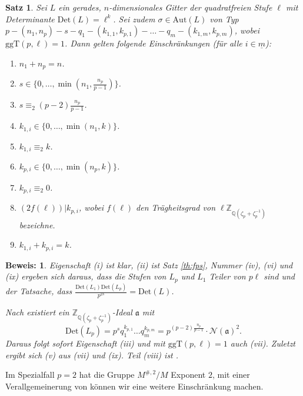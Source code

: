 \documentclass[12pt,a4paper,halfparskip,headsepline,bibtotocnumbered]{scrreprt}
\theoremstyle{nummermitklammern}
\newtheorem{satz}[defsatzusw]{Satz}
\theoremstyle{nonumberbreak}
\newtheorem{beweis}{Beweis:}
\newcommand{\Z}{\mathbb{Z}}
\newcommand{\Q}{\mathbb{Q}}
\newcommand{\No}{\mathcal{N}}
\newcommand{\Det}{\text{Det}}
\renewcommand{\a}{\mathfrak{a}}
\begin{document}
\begin{framed}
	\begin{satz} \label{th:restrict}
		Sei $L$ ein gerades, $n$-dimensionales Gitter der quadratfreien Stufe $\ell$ mit Determinante $\Det(L) = \ell^k$. Sei zudem $\sigma \in \text{Aut}(L)$ von Typ $p - (n_1, n_p) - s - q_1 - (k_{1,1}, k_{p,1}) - \dots - q_m - (k_{1,m}, k_{p,m})$, wobei $\text{ggT}(p, \ell) = 1$. Dann gelten folgende Einschränkungen (für alle $i \in \underline{m}$):
		\begin{enumerate}[label=(\roman*)]
			\item $n_1 + n_p = n$.
			\item $s \in \lbrace 0, \dots, \min(n_1, \frac{n_p}{p-1}) \rbrace$.
			\item $s \equiv_2 (p-2) \frac{n_p}{p-1}$.
			\item $k_{1,i} \in \lbrace 0, \dots, \min(n_1, k) \rbrace$.
			\item $k_{1,i} \equiv_2 k$.
			\item $k_{p,i} \in \lbrace 0, \dots, \min(n_p, k) \rbrace$.
			\item $k_{p,i} \equiv_2 0$.
			\item $\left( 2f(\ell)\right) \vert k_{p,i}$, wobei $f(\ell)$ den Trägheitsgrad von $\ell \Z_{\Q(\zeta_p + \zeta_p^{-1})}$ bezeichne.
			\item $k_{1,i} + k_{p,i} = k$.
		\end{enumerate}
	\end{satz}
\end{framed}

\begin{beweis}
	Eigenschaft (i) ist klar, (ii) ist Satz \eqref{th:fps}, Nummer (iv), (vi) und (ix) ergeben sich daraus, dass die Stufen von $L_p$ und $L_1$ Teiler von $p \ell$ sind und der Tatsache, dass $\frac{\Det(L_1) \Det(L_p)}{p^{2s}} = \Det(L)$.\par
	Nach \cite[Satz (3.1.4)(d) und Lemma (3.1.1)]{juergens} existiert ein $\Z_{\Q(\zeta_p + \zeta_p^{-1})}$-Ideal $\a$ mit
	\begin{equation*}
		\Det(L_p) = p^s q_1^{k_{p,1}} \dots q_m^{k_{p,m}} = p^{(p-2)\frac{n_p}{p-1}} \cdot \No(\a)^2.
	\end{equation*}
	Daraus folgt sofort Eigenschaft (iii) und mit $\text{ggT}(p, \ell) = 1$ auch (vii). Zuletzt ergibt sich (v) aus (vii) und (ix). Teil (viii) ist \cite[Korollar (4.1.9)]{juergens}.
\end{beweis}

Im Spezialfall $p=2$ hat die Gruppe $M^{\#, 2} / M$ Exponent $2$, mit einer Verallgemeinerung von \cite[Lemma (4.9)]{nebe} können wir eine weitere Einschränkung machen.
\end{document}
